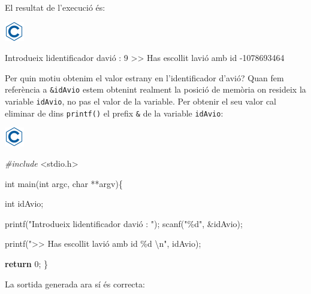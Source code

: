 \documentclass[]{book}
\newenvironment{Shaded}{\begin{snugshade}}{\end{snugshade}}
\newcommand{\ControlFlowTok}[1]{\textcolor[rgb]{0.13,0.29,0.53}{\textbf{#1}}}
\newcommand{\DataTypeTok}[1]{\textcolor[rgb]{0.13,0.29,0.53}{#1}}
\newcommand{\DecValTok}[1]{\textcolor[rgb]{0.00,0.00,0.81}{#1}}
\newcommand{\ImportTok}[1]{#1}
\newcommand{\NormalTok}[1]{#1}
\newcommand{\PreprocessorTok}[1]{\textcolor[rgb]{0.56,0.35,0.01}{\textit{#1}}}
\newcommand{\SpecialCharTok}[1]{\textcolor[rgb]{0.00,0.00,0.00}{#1}}
\newcommand{\StringTok}[1]{\textcolor[rgb]{0.31,0.60,0.02}{#1}}
\begin{document}
El resultat de l'execució és:

\includegraphics{./img/c.png}

\begin{Shaded}
\begin{Highlighting}[]
\NormalTok{Introdueix l\textquotesingle{}identificador d\textquotesingle{}avió : }\DecValTok{9}
\NormalTok{\textgreater{}\textgreater{} Has escollit l\textquotesingle{}avió amb id {-}}\DecValTok{1078693464}
\end{Highlighting}
\end{Shaded}

Per quin motiu obtenim el valor estrany en l'identificador d'avió? Quan fem referència a \texttt{\&idAvio} estem obtenint realment la posició de memòria on resideix la variable \texttt{idAvio}, no pas el valor de la variable. Per obtenir el seu valor cal eliminar de dins \texttt{printf()} el prefix \texttt{\&} de la variable \texttt{idAvio}:

\includegraphics{./img/c.png}

\begin{Shaded}
\begin{Highlighting}[]
\PreprocessorTok{\#include }\ImportTok{\textless{}stdio.h\textgreater{}}

\DataTypeTok{int}\NormalTok{ main(}\DataTypeTok{int}\NormalTok{ argc, }\DataTypeTok{char}\NormalTok{ **argv)\{}

    \DataTypeTok{int}\NormalTok{ idAvio;}

\NormalTok{    printf(}\StringTok{"Introdueix l\textquotesingle{}identificador d\textquotesingle{}avió : "}\NormalTok{);}
\NormalTok{    scanf(}\StringTok{"\%d"}\NormalTok{, \&idAvio);}
    
\NormalTok{    printf(}\StringTok{"\textgreater{}\textgreater{} Has escollit l\textquotesingle{}avió amb id \%d }\SpecialCharTok{\textbackslash{}n}\StringTok{"}\NormalTok{, idAvio);}

    \ControlFlowTok{return} \DecValTok{0}\NormalTok{;}
\NormalTok{\}}
\end{Highlighting}
\end{Shaded}

La sortida generada ara sí és correcta:
\end{document}
